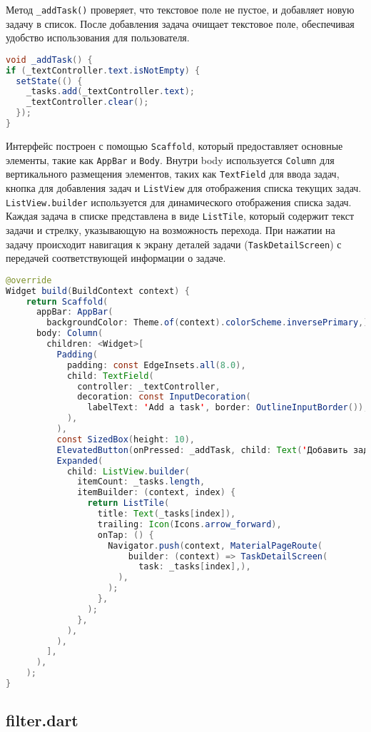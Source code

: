 Метод \texttt{\_addTask()} проверяет,
что текстовое поле не пустое, и добавляет новую задачу в список.
После добавления задача очищает текстовое поле,
обеспечивая удобство использования для пользователя.

\begin{lstlisting}[language=Java
	, caption=\leftline{Метод \_addTask()}]
void _addTask() {
if (_textController.text.isNotEmpty) {
  setState(() {
	_tasks.add(_textController.text);
	_textController.clear();
  });
}
\end{lstlisting}

Интерфейс построен с помощью \texttt{Scaffold},
который предоставляет основные элементы,
такие как \texttt{AppBar} и \texttt{Body}.
Внутри body используется \texttt{Column} для вертикального размещения элементов,
таких как \texttt{TextField} для ввода задач, кнопка для добавления задач
и \texttt{ListView} для отображения списка текущих задач.
\texttt{ListView.builder} используется для динамического отображения списка задач.
Каждая задача в списке представлена в виде \texttt{ListTile},
который содержит текст задачи и стрелку, указывающую на возможность перехода.
При нажатии на задачу происходит навигация
к экрану деталей задачи (\texttt{TaskDetailScreen})
с передачей соответствующей информации о задаче.

\break

\begin{lstlisting}[language=Java
	, caption=\leftline{Метод build}]
@override
Widget build(BuildContext context) {
	return Scaffold(
	  appBar: AppBar(
		backgroundColor: Theme.of(context).colorScheme.inversePrimary,),
	  body: Column(
		children: <Widget>[
		  Padding(
			padding: const EdgeInsets.all(8.0),
			child: TextField(
			  controller: _textController,
			  decoration: const InputDecoration(
				labelText: 'Add a task', border: OutlineInputBorder()),
			),
		  ),
		  const SizedBox(height: 10),
		  ElevatedButton(onPressed: _addTask, child: Text('Добавить задачу')),
		  Expanded(
			child: ListView.builder(
			  itemCount: _tasks.length,
			  itemBuilder: (context, index) {
				return ListTile(
				  title: Text(_tasks[index]),
				  trailing: Icon(Icons.arrow_forward),
				  onTap: () {
					Navigator.push(context, MaterialPageRoute(
						builder: (context) => TaskDetailScreen(
						  task: _tasks[index],),
					  ),
					);
				  },
				);
			  },
			),
		  ),
		],
	  ),
	);
}
\end{lstlisting}

\clearpage

\subsection{filter.dart}

